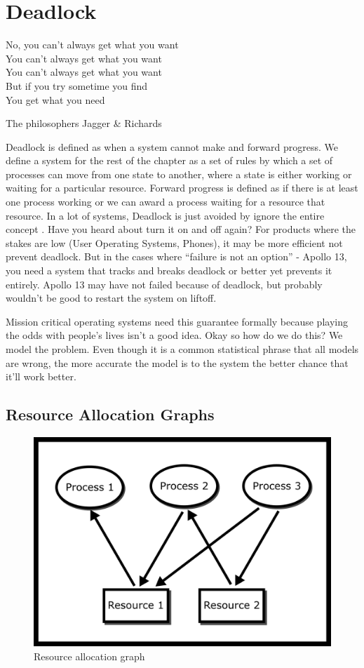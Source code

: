 \chapter{Deadlock}

\epigraph{No, you can't always get what you want
\\You can't always get what you want
\\You can't always get what you want
\\But if you try sometime you find
\\You get what you need}{The philosophers Jagger \& Richards}

\gls{Deadlock} is defined as when a system cannot make and forward progress.
We define a system for the rest of the chapter as a set of rules by which a set of processes can move from one state to another, where a state is either working or waiting for a particular resource.
Forward progress is defined as if there is at least one process working or we can award a process waiting for a resource that resource.
In a lot of systems, Deadlock is just avoided by ignore the entire concept \cite[P.237]{silberschatz2006operating}.
Have you heard about turn it on and off again?
For products where the stakes are low (User Operating Systems, Phones), it may be more efficient not prevent deadlock.
But in the cases where ``failure is not an option'' - Apollo 13, you need a system that tracks and breaks deadlock or better yet prevents it entirely.
Apollo 13 may have not failed because of deadlock, but probably wouldn't be good to restart the system on liftoff.

Mission critical operating systems need this guarantee formally because playing the odds with people's lives isn't a good idea.
Okay so how do we do this? We model the problem.
Even though it is a common statistical phrase that all models are wrong, the more accurate the model is to the system the better chance that it'll work better.

\section{Resource Allocation Graphs}

\begin{figure}[H]
\centering
\includegraphics[width=.6\textwidth]{deadlock/drawings/rag.png}
\caption{Resource allocation graph}
\label{ragfigure}
\end{figure}


